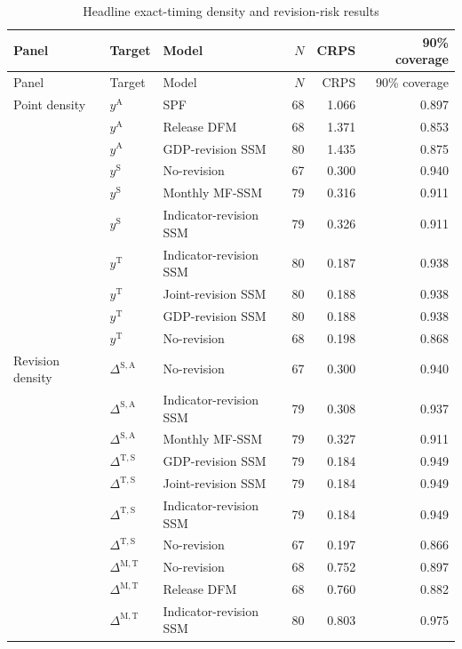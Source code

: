 \documentclass[12pt]{article}
\newcommand{\Arel}{\mathrm{A}}
\newcommand{\Srel}{\mathrm{S}}
\newcommand{\Trel}{\mathrm{T}}
\newcommand{\Mrel}{\mathrm{M}}
\newcommand{\dSA}{\Delta^{\Srel,\Arel}}
\newcommand{\dTS}{\Delta^{\Trel,\Srel}}
\newcommand{\dMT}{\Delta^{\Mrel,\Trel}}
\begin{document}
\begin{longtable}{lllrrr}
\caption{Headline exact-timing density and revision-risk results}\label{tab:density_results}\\

\toprule
Panel & Target & Model & $N$ & CRPS & 90\% coverage \\
\midrule
\endfirsthead

\toprule
Panel & Target & Model & $N$ & CRPS & 90\% coverage \\
\midrule
\endhead

Point density & $y^{\Arel}$ & SPF & 68 & 1.066 & 0.897 \\
 & $y^{\Arel}$ & Release DFM & 68 & 1.371 & 0.853 \\
 & $y^{\Arel}$ & GDP-revision SSM & 80 & 1.435 & 0.875 \\

\addlinespace
 & $y^{\Srel}$ & No-revision & 67 & 0.300 & 0.940 \\
 & $y^{\Srel}$ & Monthly MF-SSM & 79 & 0.316 & 0.911 \\
 & $y^{\Srel}$ & Indicator-revision SSM & 79 & 0.326 & 0.911 \\

\addlinespace
 & $y^{\Trel}$ & Indicator-revision SSM & 80 & 0.187 & 0.938 \\
 & $y^{\Trel}$ & Joint-revision SSM & 80 & 0.188 & 0.938 \\
 & $y^{\Trel}$ & GDP-revision SSM & 80 & 0.188 & 0.938 \\
 & $y^{\Trel}$ & No-revision & 68 & 0.198 & 0.868 \\

\midrule
Revision density & $\dSA$ & No-revision & 67 & 0.300 & 0.940 \\
 & $\dSA$ & Indicator-revision SSM & 79 & 0.308 & 0.937 \\
 & $\dSA$ & Monthly MF-SSM & 79 & 0.327 & 0.911 \\

\addlinespace
 & $\dTS$ & GDP-revision SSM & 79 & 0.184 & 0.949 \\
 & $\dTS$ & Joint-revision SSM & 79 & 0.184 & 0.949 \\
 & $\dTS$ & Indicator-revision SSM & 79 & 0.184 & 0.949 \\
 & $\dTS$ & No-revision & 67 & 0.197 & 0.866 \\

\addlinespace
 & $\dMT$ & No-revision & 68 & 0.752 & 0.897 \\
 & $\dMT$ & Release DFM & 68 & 0.760 & 0.882 \\
 & $\dMT$ & Indicator-revision SSM & 80 & 0.803 & 0.975 \\


\end{longtable}
\end{document}
